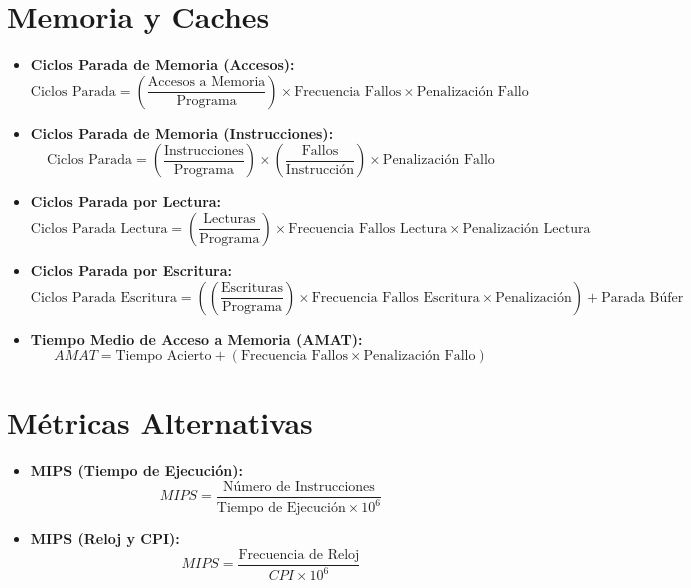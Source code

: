 \documentclass[12pt,a4paper]{article}
\begin{document}
\section*{Memoria y Caches}

\begin{itemize}
    \item \textbf{Ciclos Parada de Memoria (Accesos):} 
    $$\text{Ciclos Parada} = \left(\frac{\text{Accesos a Memoria}}{\text{Programa}}\right) \times \text{Frecuencia Fallos} \times \text{Penalización Fallo}$$

    \item \textbf{Ciclos Parada de Memoria (Instrucciones):} 
    $$\text{Ciclos Parada} = \left(\frac{\text{Instrucciones}}{\text{Programa}}\right) \times \left(\frac{\text{Fallos}}{\text{Instrucción}}\right) \times \text{Penalización Fallo}$$

    \item \textbf{Ciclos Parada por Lectura:} 
    $$\text{Ciclos Parada Lectura} = \left(\frac{\text{Lecturas}}{\text{Programa}}\right) \times \text{Frecuencia Fallos Lectura} \times \text{Penalización Lectura}$$

    \item \textbf{Ciclos Parada por Escritura:} 
    $$\text{Ciclos Parada Escritura} = \left(\left(\frac{\text{Escrituras}}{\text{Programa}}\right) \times \text{Frecuencia Fallos Escritura} \times \text{Penalización}\right) + \text{Parada Búfer}$$
    
    \item \textbf{Tiempo Medio de Acceso a Memoria (AMAT):}
    $$AMAT = \text{Tiempo Acierto} + (\text{Frecuencia Fallos} \times \text{Penalización Fallo})$$
\end{itemize}

\section*{Métricas Alternativas}

\begin{itemize}
    \item \textbf{MIPS (Tiempo de Ejecución):}
    $$MIPS = \frac{\text{Número de Instrucciones}}{\text{Tiempo de Ejecución} \times 10^6}$$
    
    \item \textbf{MIPS (Reloj y CPI):}
    $$MIPS = \frac{\text{Frecuencia de Reloj}}{CPI \times 10^6}$$
\end{itemize}
\end{document}
